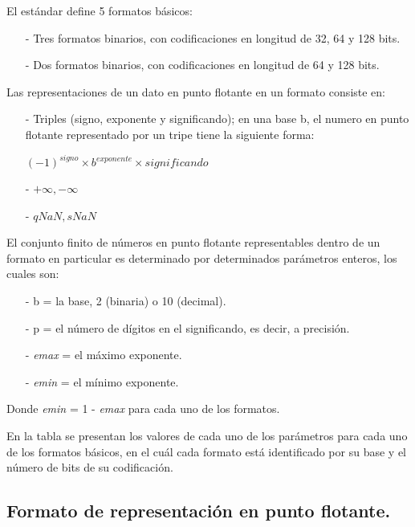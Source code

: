 El estándar define 5 formatos básicos:\\

\begin{itemize}
	\item[-]	Tres formatos binarios, con codificaciones en longitud de 32, 64 y 128 bits.
	\item[-]	Dos formatos binarios, con codificaciones en longitud de 64 y 128 bits.
\end{itemize}

Las representaciones de un dato en punto flotante en un formato consiste en:

\begin{itemize}
	\item[-]	Triples (signo, exponente y significando); en una base b, el numero en punto flotante representado por un tripe tiene la siguiente forma:\\
    \begin{center} $(-1)^{signo} \times b^{exponente} \times significando $ \end{center}
	\item[-]	$+\infty, -\infty $
	\item[-]	$qNaN, sNaN$
\end{itemize}

El conjunto finito de números en punto flotante representables dentro de un formato en particular es determinado por determinados parámetros enteros, los cuales son: \\

\begin{itemize}
	\item[-]	b = la base, 2 (binaria) o 10 (decimal).
	\item[-]	p = el número de dígitos en el significando, es decir, a precisión.
	\item[-]	\textit{emax} = el máximo exponente.
	\item[-]	\textit{emin} = el mínimo exponente.
\end{itemize}

Donde \textit{emin} = 1 - \textit{emax} para cada uno de los formatos.

En la tabla  se presentan los valores de cada uno de los parámetros para cada uno de los formatos básicos, en el cuál cada formato está identificado por su base y el número de bits de su codificación.\\  

\subsection{Formato de representación en punto flotante.}



